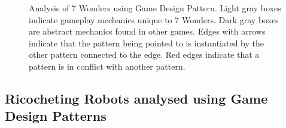 \documentclass[a4paper]{article}
\begin{document}
\begin{figure}[htb]
\begin{tikzpicture}[scale=.8, transform shape]

  \end{tikzpicture}
\caption{Analysis of 7 Wonders using Game Design Pattern.
Light gray boxes indicate gameplay mechanics unique to 7 Wonders.
Dark gray boxes are abstract mechanics found in other games.
Edges with arrows indicate that the pattern being pointed to is instantiated by the other pattern connected to the edge.
Red edges indicate that a pattern is in conflict with another pattern.}

\label{fig:A7W}
\end{figure}

\newpage
\subsection{Ricocheting Robots analysed using Game Design Patterns}
\end{document}
